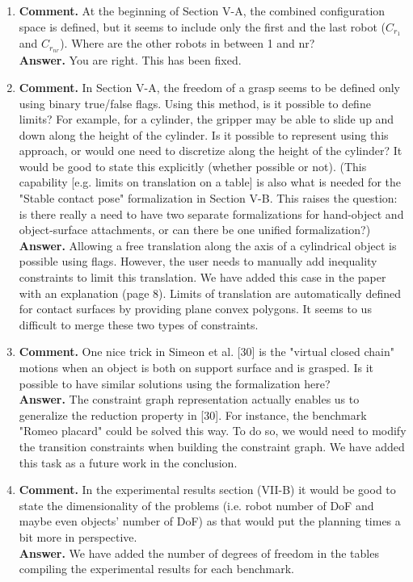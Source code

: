 \documentclass{article}
\begin{document}
\begin{enumerate}
\item \textbf{Comment.} At the beginning of Section V-A, the combined
  configuration space is defined, but it seems to include only the
  first and the last robot ($C_{r_1}$ and $C_{r_{nr}}$). Where are the other
  robots in between 1 and nr?\\ \textbf{Answer.} You are right. This has
  been fixed.

\item \textbf{Comment.} In Section V-A, the freedom of a grasp seems
  to be defined only using binary true/false flags. Using this method,
  is it possible to define limits? For example, for a cylinder, the
  gripper may be able to slide up and down along the height of the
  cylinder. Is it possible to represent using this approach, or would
  one need to discretize along the height of the cylinder? It would be
  good to state this explicitly (whether possible or not). (This
  capability [e.g. limits on translation on a table] is also what is
  needed for the "Stable contact pose" formalization in Section
  V-B. This raises the question: is there really a need to have two
  separate formalizations for hand-object and object-surface
  attachments, or can there be one unified
  formalization?)\\
  \textbf{Answer.} Allowing a free translation along the axis of a
  cylindrical object is possible using flags. However, the user needs
  to manually add inequality constraints to limit this translation. We
  have added this case in the paper with an explanation (page
  8). Limits of translation are automatically defined for contact
  surfaces by providing plane convex polygons. It seems to us
  difficult to merge these two types of constraints.

\item \textbf{Comment.} One nice trick in Simeon et al. [30] is the
  "virtual closed chain" motions when an object is both on support
  surface and is grasped. Is it possible to have similar solutions
  using the formalization here?\\
  \textbf{Answer.} The constraint graph representation actually
  enables us to generalize the reduction property in [30]. For
  instance, the benchmark "Romeo placard" could be solved this way. To
  do so, we would need to modify the transition constraints when
  building the constraint graph. We have added this task as a future
  work in the conclusion.

\item \textbf{Comment.} In the experimental results section (VII-B) it
  would be good to state the dimensionality of the problems
  (i.e. robot number of DoF and maybe even objects' number of DoF) as
  that would put the planning times a bit more in
  perspective.\\
  \textbf{Answer.} We have added the number of degrees of freedom in the tables
  compiling the experimental results for each benchmark.
\end{enumerate}
\end{document}
